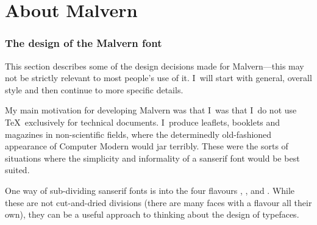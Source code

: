 \fi

\iflong 

\fi
% 
	

\part{About Malvern}

\section{The design of the Malvern font}

	This section describes some of the design decisions made for
	Malvern---this may not be strictly relevant to most people's use
	of it.  I~will start with general, overall style and then
	continue to more specific details.

	My main motivation for developing Malvern was that I~was that
	I~do not use \TeX\ exclusively for technical documents.
	I~produce  leaflets, booklets and magazines in
	non-scientific fields, where the determinedly old-fashioned
	appearance of Computer Modern would jar terribly.  These were
	the sorts of situations where the simplicity and informality of
	a sanserif font would be best suited.


	One way of sub-dividing sanserif fonts is into the four flavours
	, ,  and
	.  While these are not cut-and-dried
	divisions (there are many faces with a flavour all their own),
	they can be a useful approach to thinking about the design of
	typefaces.


